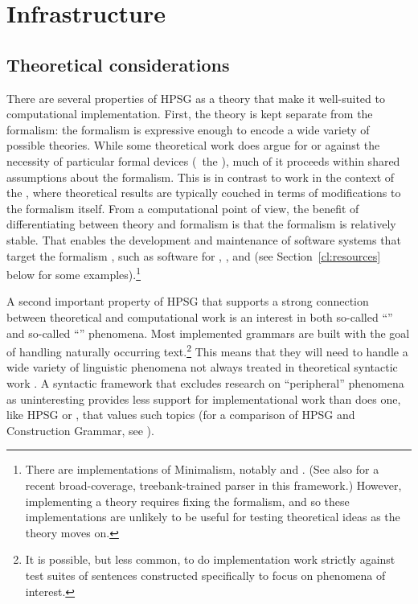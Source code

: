 \documentclass[output=paper,nonflat]{langsci/langscibook}
\begin{document}
\section{Infrastructure}
\label{cl:infrastructure}

\subsection{Theoretical considerations}
\label{cl:theoretical}

There are several properties of HPSG as a theory that make it well-suited to computational implementation.
First, the theory is kept separate from the formalism:
the formalism is expressive enough to encode a wide variety of possible theories.
While some theoretical work does argue for or against the necessity of particular formal devices
(\eg\ the  \citep{Reape94a}),
much of it proceeds within shared assumptions about the formalism.
This is in contrast to work in the context of the  \citep{Chomsky95a-u},
where theoretical results are typically couched in terms of modifications to the formalism itself.
From a computational point of view, the benefit of differentiating between theory and formalism
is that the formalism is relatively stable.
That enables the development and maintenance of software systems that target the formalism \citep{boguraev1988software},
such as software for , , and 
(see Section~\ref{cl:resources} below for some examples).\footnote{%
	There are implementations of Minimalism, notably \citealt{Stabler97a-u} and \citealt{Herring:16}. (See also \citealt{Tor:Sta:Ste:19} for a recent broad-coverage, treebank-trained parser in this framework.)
	However, implementing a theory requires fixing the formalism,
	and so these implementations are unlikely to be useful for testing theoretical ideas as the theory moves on.
}

A second important property of HPSG that supports a strong connection between theoretical and computational work is an interest in both so-called ``'' and so-called ``'' phenomena. Most implemented grammars are built with the goal of handling naturally occurring text.\footnote{It is possible, but less common, to do implementation work strictly against test suites of sentences constructed specifically to focus on phenomena of interest.} This means that they will need to handle a wide variety of linguistic phenomena not always treated in theoretical syntactic work \citep{Baldwin-et-al-05}. A syntactic framework that excludes research on ``peripheral'' phenomena as uninteresting provides less support for implementational work than does one, like HPSG or , that values such topics (for a comparison of HPSG and Construction Grammar, see ).
\end{document}
